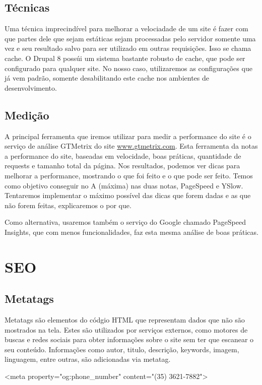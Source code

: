 \subsection{Técnicas}
Uma técnica imprecindível para melhorar a velociadade de um site é fazer com que partes dele que sejam estáticas sejam processadas pelo servidor somente uma vez e seu resultado salvo para ser utilizado em outras requisições. Isso se chama cache. O Drupal 8 possúi um sistema bastante robusto de cache, que pode ser configurado para qualquer site. No nosso caso, utilizaremos as configurações que já vem padrão, somente desabilitando este cache nos ambientes de desenvolvimento.

\subsection{Medição}
A principal ferramenta que iremos utilizar para medir a performance do site é o serviço de análise GTMetrix do site \url{www.gtmetrix.com}. Esta ferramenta da notas a performance do site, baseadas em velocidade, boas práticas, quantidade de requests e tamanho total da página. Nos resultados, podemos ver dicas para melhorar a performance, mostrando o que foi feito e o que pode ser feito. Temos como objetivo conseguir no A (máxima) nas duas notas, PageSpeed e YSlow. Tentaremos implementar o máximo possível das dicas que forem dadas e as que não forem feitas, explicaremos o por que.

Como alternativa, usaremos também o serviço do Google chamado PageSpeed Insights, que com menos funcionalidades, faz esta mesma análise de boas práticas.

\section{SEO}

\subsection{Metatags}
Metatags são elementos do códgio HTML que representam dados que não são mostrados na tela. Estes são utilizados por serviços externos, como motores de buscas e redes sociais para obter informações sobre o site sem ter que escanear o seu conteúdo. Informações como autor, titulo, descrição, keywords, imagem, linguagem, entre outras, são adicionadas via metatag.

\begin{center}
  <meta property="og:phone_number" content="(35) 3621-7882">
\end{center}

